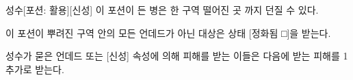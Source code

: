 \documentclass{report}
\begin{document}
	\begin{story}{성수}{[포션: 활용][신성]}
		이 포션이 든 병은 한 구역 떨어진 곳 까지 던질 수 있다.
		
		이 포션이 뿌려진 구역 안의 모든 언데드가 아닌 대상은 상태 [정화됨 □]을 받는다.
		
		성수가 묻은 언데드 또는 [신성] 속성에 의해 피해를 받는 이들은 다음에 받는 피해를 1 추가로 받는다.
		
	\end{story}
\end{document}
